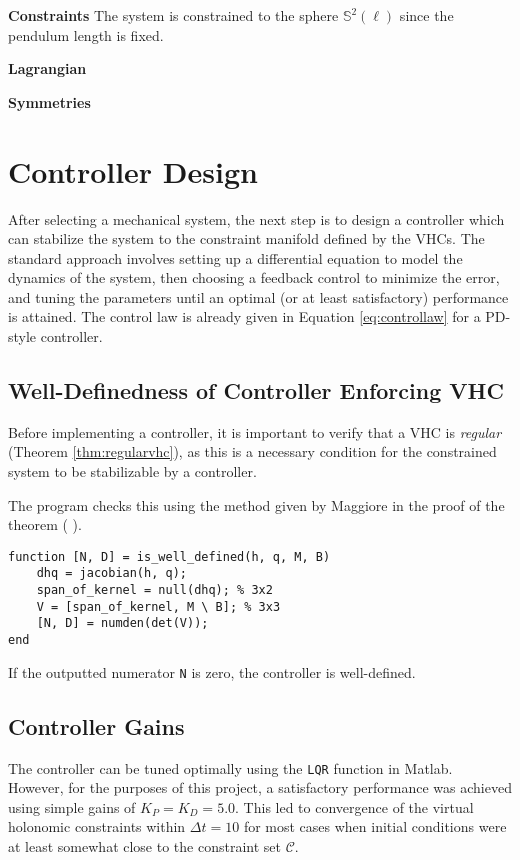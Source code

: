 \documentclass[main.tex]{subfiles}
\begin{document}
\textbf{Constraints} The system is constrained to the sphere $\mathbb{S}^2(\ell)$ since the pendulum length is fixed.

\textbf{Lagrangian}

\textbf{Symmetries}


\section{Controller Design}
After selecting a mechanical system, the next step is to design a controller which can stabilize the system to the constraint manifold defined by the VHCs. 
The standard approach involves setting up a differential equation to model the dynamics of the system, then choosing a feedback control to minimize the error, and tuning the parameters until an optimal (or at least satisfactory) performance is attained\cite{franklin2002feedback}. The control law is already given in Equation \ref{eq:controllaw} for a PD-style controller.
\subsection{Well-Definedness of Controller Enforcing VHC}
Before implementing a controller, it is important to verify that a VHC is \textit{regular} (Theorem \ref{thm:regularvhc}), as this is a necessary condition for the constrained system to be stabilizable by a controller.

The program checks this using the method given by Maggiore in the proof of the theorem ( \cite[Prop. 3.2]{maggiore2012virtual}).
\begin{lstlisting}
function [N, D] = is_well_defined(h, q, M, B)
    dhq = jacobian(h, q);
    span_of_kernel = null(dhq); % 3x2
    V = [span_of_kernel, M \ B]; % 3x3
    [N, D] = numden(det(V));
end
\end{lstlisting}
If the outputted numerator \verb|N| is zero, the controller is well-defined.
\subsection{Controller Gains}
The controller can be tuned optimally using the \verb|LQR| function in Matlab. However, for the purposes of this project, a satisfactory performance was achieved using simple gains of $K_P=K_D=5.0$. This led to convergence of the virtual holonomic constraints within $\Delta t=10$ for most cases when initial conditions were at least somewhat close to the constraint set $\mathcal{C}$.
\end{document}
